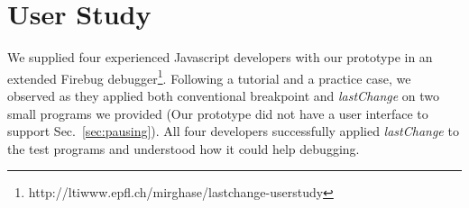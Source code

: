 \documentclass{sig-alternate}
\begin{document}



\section{User Study}
We supplied four experienced Javascript developers with our prototype in an 
extended Firebug debugger\footnote[5]{http://ltiwww.epfl.ch/\texttildelow mirghase/lastchange-userstudy}. Following a tutorial and a practice case, we observed as they 
applied both conventional breakpoint and \textit{lastChange} on two small programs we 
provided (Our prototype did not have a user interface to support Sec.~\ref{sec:pausing}).
All four developers successfully applied \textit{lastChange} to the test programs 
and understood how it could help debugging. 
\end{document}
